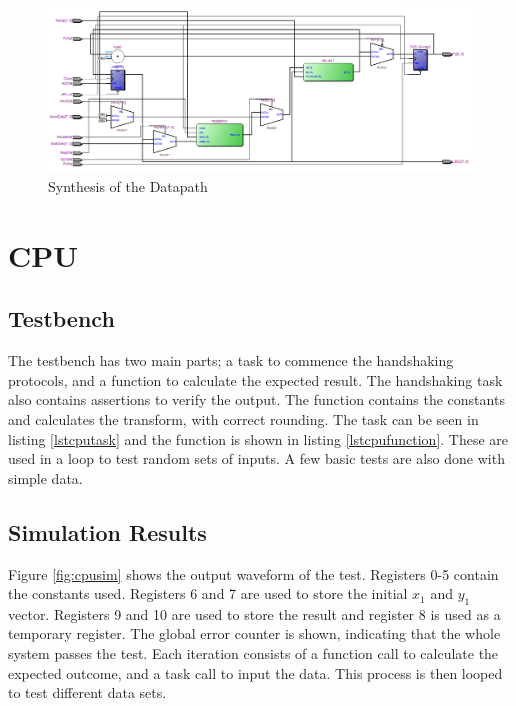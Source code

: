 \begin{figure}
\includegraphics[width=\textwidth]{Figures/datapathsynth.png}
\caption{Synthesis of the Datapath}
\label{fig:datapathsynth}
\end{figure}


\section{CPU}
\subsection{Testbench}

The testbench has two main parts; a task to commence the handshaking protocols, and a function to calculate the expected result. 
The handshaking task also contains assertions to verify the output. 
The function contains the constants and calculates the transform, with correct rounding.
The task can be seen in listing \ref{lstcputask} and the function is shown in listing \ref{lstcpufunction}.
These are used in a loop to test random sets of inputs. 
A few basic tests are also done with simple data. 







\subsection{Simulation Results}

Figure \ref{fig:cpusim} shows the output waveform of the test. 
Registers 0-5 contain the constants used. 
Registers 6 and 7 are used to store the initial $x_1$ and $y_1$ vector. 
Registers 9 and 10 are used to store the result and register 8 is used as a temporary register. 
The global error counter is shown, indicating that the whole system passes the test. 
Each iteration consists of a function call to calculate the expected outcome, and a task call to input the data. 
This process is then looped to test different data sets. 

